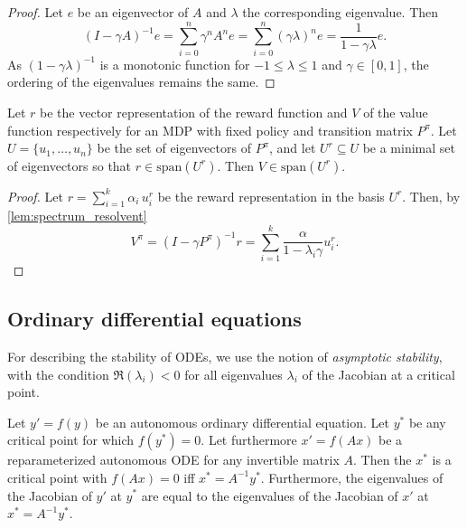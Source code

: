 \begin{proof}
    Let $e$ be an eigenvector of $A$ and $\lambda$ the corresponding eigenvalue. Then $$(I - \gamma A)^{-1}e = \sum_{i=0}^n \gamma^n A^ne = \sum_{i=0}^n (\gamma\lambda)^n e = \frac{1}{1 - \gamma\lambda}e.$$ As $(1-\gamma\lambda)^{-1}$ is a monotonic function for $-1 \leq \lambda \leq 1$ and $\gamma\in[0,1]$, the ordering of the eigenvalues remains the same.
\end{proof}

\begin{lemma}\label{lem:spectrum_rew_value}
    Let $r$ be the vector representation of the reward function and $V$ of the value function respectively for an MDP with fixed policy and transition matrix $P^\pi$.
    Let $U = \{u_1,\dots,u_n\}$ be the set of eigenvectors of $P^\pi$, and let $U^r \subseteq U$ be a minimal set of eigenvectors so that $r \in \mathrm{span}(U^r)$.
    Then $V \in \mathrm{span}(U^r)$.
\end{lemma}
\begin{proof}
    Let $r = \sum_{i=1}^k \alpha_i\, u^r_i$ be the reward representation in the basis $U^r$. Then, by \autoref{lem:spectrum_resolvent} $$V^\pi = (I - \gamma P^\pi)^{-1} r = \sum_{i=1}^k \frac{\alpha}{1 - \lambda_i\gamma}  u^r_i.$$
\end{proof}


\subsection{Ordinary differential equations}

For describing the stability of ODEs, we use the notion of \emph{asymptotic stability}, with the condition $\Re(\lambda_i) < 0$ for all eigenvalues $\lambda_i$ of the Jacobian at a critical point.

\begin{lemma}
\label{lem:stability}
Let $y' = f(y)$ be an autonomous ordinary differential equation. Let $y^*$ be any critical point for which $f(y^*) = 0$. Let furthermore $x' = f(A x)$ be a reparameterized autonomous ODE for any invertible matrix $A$.
Then the $x^*$ is a critical point with $f(Ax) = 0$ iff $x^* = A^{-1}y^*$.
Furthermore, the eigenvalues of the Jacobian of $y'$ at $y^*$ are equal to the eigenvalues of the Jacobian of $x'$ at $x^* = A^{-1}y^*$.
\end{lemma}

